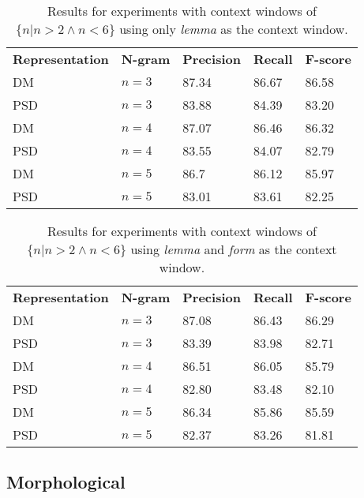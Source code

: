 \begin{table}
    \centering
    \smaller[0.2]
    \begin{tabular}{@{}lllll@{}}
        \toprule
        \textbf{Representation} & \textbf{N-gram} & \textbf{Precision} & \textbf{Recall} & \textbf{F-score} \\
        DM & $n=3$ & 87.34 & 86.67 & 86.58 \\
        PSD & $n=3$ & 83.88 & 84.39 & 83.20 \\
        \midrule
        DM & $n=4$  & 87.07 & 86.46 & 86.32 \\
        PSD & $n=4$ & 83.55 & 84.07 & 82.79 \\
        \midrule
        DM & $n=5$  & 86.7 & 86.12 & 85.97 \\
        PSD & $n=5$ & 83.01 & 83.61 & 82.25 \\
        \bottomrule
    \end{tabular}
    \caption{Results for experiments with context windows of ${\{n|n>2 \wedge n<6\}}$ using only \textit{lemma} as the context window.}
    \label{table:lemma_context}
\end{table}

\begin{table}
    \centering
    \smaller[0.2]
    \begin{tabular}{@{}lllll@{}}
        \toprule
        \textbf{Representation} & \textbf{N-gram} & \textbf{Precision} & \textbf{Recall} & \textbf{F-score} \\
        DM & $n=3$ &  87.08 & 86.43 & 86.29 \\
        PSD & $n=3$ & 83.39 & 83.98 & 82.71 \\
        \midrule
        DM & $n=4$  & 86.51 & 86.05 & 85.79 \\
        PSD & $n=4$ & 82.80 & 83.48 & 82.10 \\
        \midrule
        DM & $n=5$  & 86.34 & 85.86 & 85.59 \\
        PSD & $n=5$ & 82.37 & 83.26 & 81.81 \\
        \bottomrule
    \end{tabular}
    \caption{Results for experiments with context windows of ${\{n|n>2 \wedge n<6\}}$ using \textit{lemma} and \textit{form} as the context window.}
    \label{table:form_lemma_context}
\end{table}




\subsection{Morphological}
\label{results_lex}

